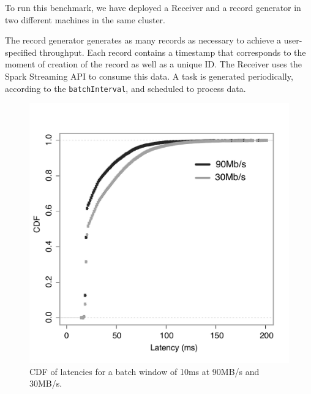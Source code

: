 
To run this benchmark, we have deployed a Receiver and a record generator in two different machines in the same cluster.

The record generator generates as many records as necessary to achieve a user-specified throughput.
Each record contains a timestamp that corresponds to the moment of creation of the record as well as a unique ID.
The Receiver uses the Spark Streaming API to consume this data. 
A task is generated periodically, according to the  \texttt{batchInterval}, and scheduled to process data.


\begin{figure}[t!]
  \begin{center}
    \includegraphics[scale=0.48]{images_graphs/cdf_latencies/cdf_e2e_times_illus.pdf}
  \end{center}
  \caption{CDF of latencies for a batch window of 10ms at 90MB/s and 30MB/s.}
  \label{fig:CDF_latencies}
\end{figure}


